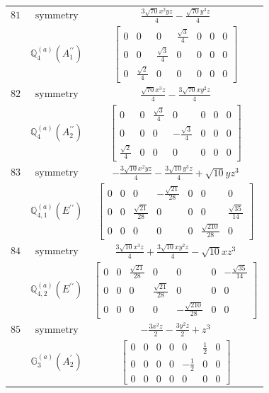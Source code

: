 \documentclass[fleqn,8pt,landscape]{jsarticle}
\begin{document}
\begin{longtable}{ccc}
$ 81 $ & $ \text{symmetry} $ & $ \frac{3 \sqrt{70} x^{2} y z}{4} - \frac{\sqrt{70} y^{3} z}{4} $ \\
$  $ & $ \mathbb{Q}_{4}^{(a)}(A_{1}^{\prime\prime}) $ & $ \begin{bmatrix} 0 & 0 & 0 & \frac{\sqrt{3}}{4} & 0 & 0 & 0 \\ 0 & 0 & \frac{\sqrt{3}}{4} & 0 & 0 & 0 & 0 \\ 0 & \frac{\sqrt{2}}{4} & 0 & 0 & 0 & 0 & 0 \end{bmatrix} $ \\ \hline
$ 82 $ & $ \text{symmetry} $ & $ \frac{\sqrt{70} x^{3} z}{4} - \frac{3 \sqrt{70} x y^{2} z}{4} $ \\
$  $ & $ \mathbb{Q}_{4}^{(a)}(A_{2}^{\prime\prime}) $ & $ \begin{bmatrix} 0 & 0 & \frac{\sqrt{3}}{4} & 0 & 0 & 0 & 0 \\ 0 & 0 & 0 & - \frac{\sqrt{3}}{4} & 0 & 0 & 0 \\ \frac{\sqrt{2}}{4} & 0 & 0 & 0 & 0 & 0 & 0 \end{bmatrix} $ \\ \hline
$ 83 $ & $ \text{symmetry} $ & $ - \frac{3 \sqrt{10} x^{2} y z}{4} - \frac{3 \sqrt{10} y^{3} z}{4} + \sqrt{10} y z^{3} $ \\
$  $ & $ \mathbb{Q}_{4,1}^{(a)}(E^{\prime\prime}) $ & $ \begin{bmatrix} 0 & 0 & 0 & - \frac{\sqrt{21}}{28} & 0 & 0 & 0 \\ 0 & 0 & \frac{\sqrt{21}}{28} & 0 & 0 & 0 & \frac{\sqrt{35}}{14} \\ 0 & 0 & 0 & 0 & 0 & \frac{\sqrt{210}}{28} & 0 \end{bmatrix} $ \\ \hline
$ 84 $ & $ \text{symmetry} $ & $ \frac{3 \sqrt{10} x^{3} z}{4} + \frac{3 \sqrt{10} x y^{2} z}{4} - \sqrt{10} x z^{3} $ \\
$  $ & $ \mathbb{Q}_{4,2}^{(a)}(E^{\prime\prime}) $ & $ \begin{bmatrix} 0 & 0 & \frac{\sqrt{21}}{28} & 0 & 0 & 0 & - \frac{\sqrt{35}}{14} \\ 0 & 0 & 0 & \frac{\sqrt{21}}{28} & 0 & 0 & 0 \\ 0 & 0 & 0 & 0 & - \frac{\sqrt{210}}{28} & 0 & 0 \end{bmatrix} $ \\ \hline
$ 85 $ & $ \text{symmetry} $ & $ - \frac{3 x^{2} z}{2} - \frac{3 y^{2} z}{2} + z^{3} $ \\
$  $ & $ \mathbb{G}_{3}^{(a)}(A_{2}^{\prime}) $ & $ \begin{bmatrix} 0 & 0 & 0 & 0 & 0 & \frac{1}{2} & 0 \\ 0 & 0 & 0 & 0 & - \frac{1}{2} & 0 & 0 \\ 0 & 0 & 0 & 0 & 0 & 0 & 0 \end{bmatrix} $ \\ \hline

\end{longtable}
\end{document}
